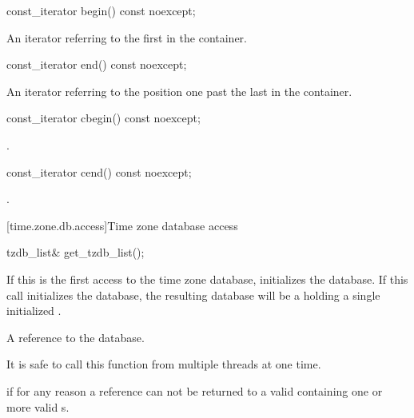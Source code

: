 %
\begin{itemdecl}
const_iterator begin() const noexcept;
\end{itemdecl}

\begin{itemdescr}
\pnum
\returns
An iterator referring to the first  in the container.
\end{itemdescr}

%
\begin{itemdecl}
const_iterator end() const noexcept;
\end{itemdecl}

\begin{itemdescr}
\pnum
\returns
An iterator referring to the position one past the last  in the container.
\end{itemdescr}

%
\begin{itemdecl}
const_iterator cbegin() const noexcept;
\end{itemdecl}

\begin{itemdescr}
\pnum
\returns {}.
\end{itemdescr}

%
\begin{itemdecl}
const_iterator cend() const noexcept;
\end{itemdecl}

\begin{itemdescr}
\pnum
\returns {}.
\end{itemdescr}

[time.zone.db.access]{Time zone database access}

%
\begin{itemdecl}
tzdb_list& get_tzdb_list();
\end{itemdecl}

\begin{itemdescr}
\pnum
\effects
If this is the first access to the time zone database,
initializes the database.
If this call initializes the database,
the resulting database will be a 
holding a single initialized .

\pnum
\returns
A reference to the database.

\pnum
\remarks
It is safe to call this function from multiple threads at one time.

\pnum
\throws
{} if for any reason
a reference can not be returned to a valid 
containing one or more valid s.
\end{itemdescr}

